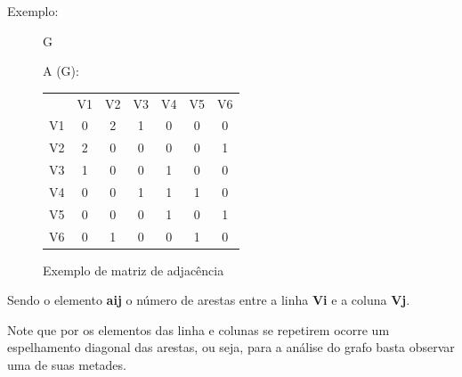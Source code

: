 \documentclass[a4paper, 12pt]{article}
\begin{document}
    \vspace{0.5in}
    
    \pagebreak
    
    Exemplo:
    
    \begin{figure}[hbt!]
        \begin{multicols}{2}
            \begin{center}
            G\:
            \end{center}
            
            A (G):
            \begin{tabular}{ccccccc}
                    & V1 & V2 & V3 & V4 & V5 & V6 \\
                    V1 & 0  & 2  & 1  & 0  & 0  & 0  \\
                    V2 & 2  & 0  & 0  & 0  & 0  & 1  \\
                    V3 & 1  & 0  & 0  & 1  & 0  & 0  \\
                    V4 & 0  & 0  & 1  & 1  & 1  & 0  \\
                    V5 & 0  & 0  & 0  & 1  & 0  & 1  \\
                    V6 & 0  & 1  & 0  & 0  & 1  & 0 
            \end{tabular}
        \end{multicols}
        \caption{Exemplo de matriz de adjacência}
    \end{figure}
    
    \vspace{0.5in}
    
    Sendo o elemento \textbf{aij} o número de arestas entre a linha \textbf{Vi} e a coluna \textbf{Vj}. 
    
    \indent Note que por os elementos das linha e colunas se repetirem ocorre um espelhamento diagonal das arestas, ou seja, para a análise do grafo basta observar uma de suas metades. 
\end{document}
